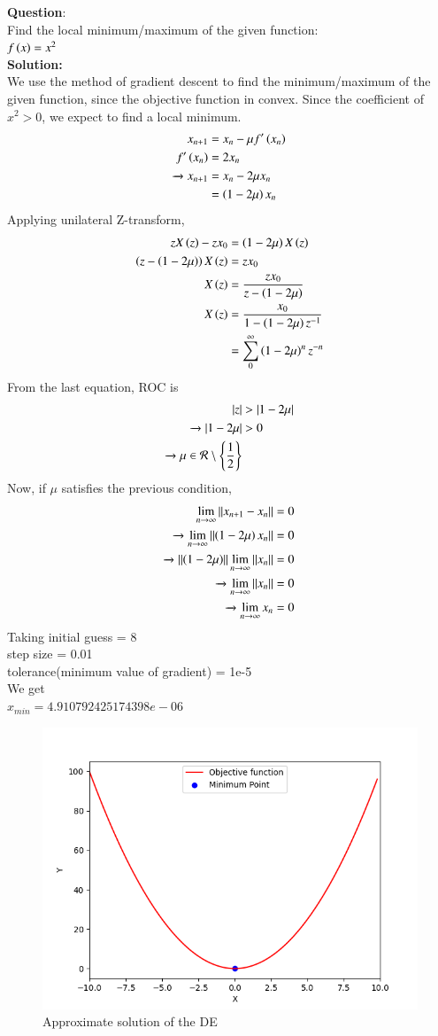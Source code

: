 \documentclass[journal]{IEEEtran}
\begin{document}
\textbf{Question}:\\
Find the local minimum/maximum of the given function:\\
$f\left(x\right) = x^2$
\\
\textbf{Solution: }\\
We use the method of gradient descent to find the minimum/maximum of the given function, since the objective function in convex.
Since the coefficient of $x^2 > 0$, we expect to find a local minimum.
\begin{align}
    x_{n+1} &= x_n - \mu f^{\prime}\left(x_n\right)\\
    f^{\prime}\left(x_n\right) &= 2x_n\\
    \xrightarrow{} x_{n+1} &= x_n - 2\mu x_n \\
    &= \left(1-2\mu\right)x_n
\end{align}
Applying unilateral Z-transform,
\begin{align}
    zX\left(z\right) - zx_0 &= \left(1-2\mu\right)X\left(z\right)\\
    \left(z - \left(1-2\mu\right)\right)X\left(z\right) &= zx_0\\
    X\left(z\right) &= \frac{zx_0}{z - \left(1-2\mu\right)}\\
    X\left(z\right) &= \frac{x_0}{1 - \left(1-2\mu\right)z^{-1}}\\
    &= \sum_{0}^{\infty} \left(1-2\mu\right)^n z^{-n}
\end{align}
From the last equation, ROC is 
\begin{align}
    |z| &> |1-2\mu|\\
    \xrightarrow{} |1-2\mu| &> 0\\
    \xrightarrow{} \mu \in \mathcal{R} \setminus \left\{\frac{1}{2}\right\}
\end{align}
Now, if $\mu$ satisfies the previous condition,
\begin{align}
    \lim_{n \to \infty} \left\lVert x_{n+1} - x_n\right\rVert = 0\\
    \xrightarrow{} \lim_{n \to \infty} \left\lVert\left(1-2\mu\right)x_n\right\rVert = 0\\
    \xrightarrow{} \left\lVert\left(1-2\mu\right)\right\rVert\lim_{n \to \infty} \left\lVert x_n\right\rVert = 0\\
    \xrightarrow{} \lim_{n \to \infty} \left\lVert x_n\right\rVert = 0\\
    \xrightarrow{} \lim_{n \to \infty} x_n = 0
\end{align}
Taking initial guess = 8\\ step size = 0.01\\ tolerance(minimum value of gradient) = 1e-5\\ We get \\
$x_{min} = 4.910792425174398e-06$
\begin{figure}[h!]
   \centering
   \includegraphics[width=0.7\columnwidth]{figs/fig.png}
    \caption{Approximate solution of the DE}
\end{figure}
\end{document}
